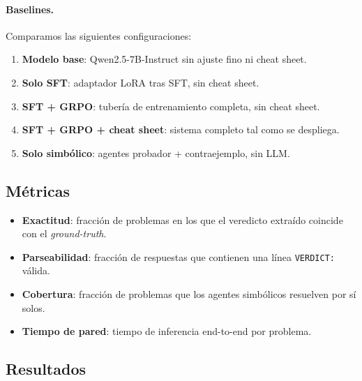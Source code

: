 \documentclass{article}
\begin{document}
\paragraph{Baselines.} Comparamos las siguientes configuraciones:
\begin{enumerate}[label=(\alph*),itemsep=1pt]
  \item \textbf{Modelo base}: Qwen2.5-7B-Instruct sin ajuste fino ni cheat sheet.
  \item \textbf{Solo SFT}: adaptador LoRA tras SFT, sin cheat sheet.
  \item \textbf{SFT + GRPO}: tuber\'ia de entrenamiento completa, sin cheat sheet.
  \item \textbf{SFT + GRPO + cheat sheet}: sistema completo tal como se despliega.
  \item \textbf{Solo simb\'olico}: agentes probador + contraejemplo, sin LLM.
\end{enumerate}

\subsection{M\'etricas}

\begin{itemize}[itemsep=1pt]
  \item \textbf{Exactitud}: fracci\'on de problemas en los que el veredicto extra\'ido coincide con el \textit{ground-truth}.
  \item \textbf{Parseabilidad}: fracci\'on de respuestas que contienen una l\'inea \texttt{VERDICT:} v\'alida.
  \item \textbf{Cobertura}: fracci\'on de problemas que los agentes simb\'olicos resuelven por s\'i solos.
  \item \textbf{Tiempo de pared}: tiempo de inferencia end-to-end por problema.
\end{itemize}

\subsection{Resultados}
\end{document}
